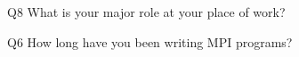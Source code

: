 \begin{description}%
\item{Q8} What is your major role at your place of work?%
\item{Q6} How long have you been writing MPI programs?%
\end{description}%
